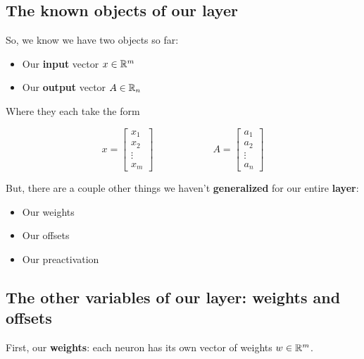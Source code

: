     \subsection{The known objects of our layer}
    
        So, we know we have two objects so far:
        
        \begin{itemize}
            \item Our \textbf{input} vector $x \in \mathbb R^m$
            
            \item Our \textbf{output} vector $A \in \mathbb R_n$

        \end{itemize}
        
        Where they each take the form
        
        \begin{equation}
            x = 
                \begin{bmatrix}
                  x_1\\x_2\\ \vdots \\ x_m
                \end{bmatrix}
            \qquad \qquad \qquad
            A =
            \begin{bmatrix}
                a_1\\a_2\\ \vdots \\ a_n
            \end{bmatrix}
        \end{equation}
        
        But, there are a couple other things we haven't \textbf{generalized} for our entire \textbf{layer}:
        
        \begin{itemize}
            \item Our weights 
            \item Our offsets
            \item Our preactivation
        \end{itemize}
        
        \subsection{The other variables of our layer: weights and offsets}
        
        First, our \textbf{weights}: each neuron has its own vector of weights $w \in \mathbb R^m$.
            
